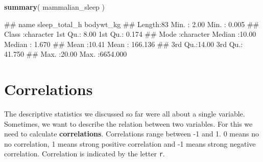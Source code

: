 \documentclass[
]{book}
\newenvironment{Shaded}{\begin{snugshade}}{\end{snugshade}}
\newcommand{\FunctionTok}[1]{\textcolor[rgb]{0.13,0.29,0.53}{\textbf{#1}}}
\newcommand{\NormalTok}[1]{#1}
\begin{document}
\begin{Shaded}
\begin{Highlighting}[]
\FunctionTok{summary}\NormalTok{( mammalian\_sleep )}
\end{Highlighting}
\end{Shaded}

\begin{Shaded}
\begin{Highlighting}[]
\NormalTok{\#\#      name           sleep\_total\_h     bodywt\_kg       }
\NormalTok{\#\#  Length:83          Min.   : 2.00   Min.   :   0.005  }
\NormalTok{\#\#  Class :character   1st Qu.: 8.00   1st Qu.:   0.174  }
\NormalTok{\#\#  Mode  :character   Median :10.00   Median :   1.670  }
\NormalTok{\#\#                     Mean   :10.41   Mean   : 166.136  }
\NormalTok{\#\#                     3rd Qu.:14.00   3rd Qu.:  41.750  }
\NormalTok{\#\#                     Max.   :20.00   Max.   :6654.000}
\end{Highlighting}
\end{Shaded}

\hypertarget{correlations}{%
\section{Correlations}\label{correlations}}

The descriptive statistics we discussed so far were all about a single variable. Sometimes, we want to describe the relation between two variables. For this we need to calculate \textbf{correlations}. Correlations range between -1 and 1. 0 means no no correlation, 1 means strong positive correlation and -1 means strong negative correlation. Correlation is indicated by the letter \texttt{r}.
\end{document}
